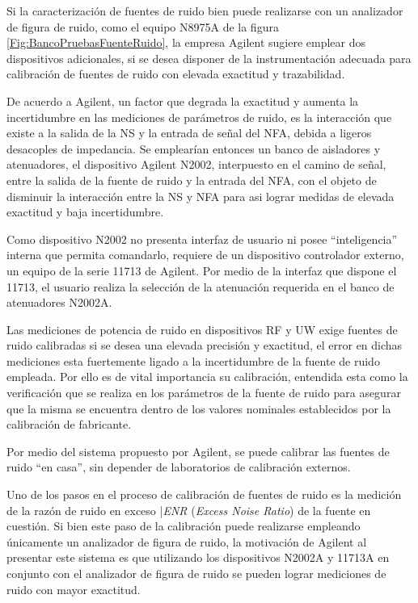 \documentclass{article}
\begin{document}
	Si la caracterización de fuentes de ruido bien puede realizarse con un analizador de figura de ruido, como el equipo N8975A de la figura \ref{Fig:BancoPruebasFuenteRuido}, la empresa Agilent sugiere emplear dos dispositivos adicionales, si se desea disponer de la instrumentación adecuada para calibración de fuentes de ruido con elevada exactitud y trazabilidad. 
	
	De acuerdo a Agilent, un factor que degrada la exactitud y aumenta la incertidumbre en las mediciones de parámetros de ruido, es la interacción que existe a la salida de la NS y la entrada de señal del NFA, debida a ligeros desacoples de impedancia. Se emplearían entonces un banco de aisladores y atenuadores, el dispositivo Agilent N2002, interpuesto en el camino de señal, entre la salida de la fuente de ruido y la entrada del NFA, con el objeto de disminuir la interacción entre la NS y NFA para asi lograr medidas de elevada exactitud y baja incertidumbre.
	
	Como dispositivo N2002 no presenta interfaz de usuario ni posee “inteligencia” interna que permita comandarlo, requiere de un dispositivo controlador externo, un equipo de la serie 11713 de Agilent. Por medio de la interfaz que dispone el 11713, el usuario realiza la selección de la atenuación requerida en el banco de atenuadores N2002A.
	
	Las mediciones de potencia de ruido en dispositivos RF y UW exige fuentes de ruido calibradas si se desea una elevada precisión y exactitud, el error en dichas mediciones esta fuertemente ligado a la incertidumbre de la fuente de ruido	empleada. Por ello es de vital importancia su calibración, entendida esta como la verificación que se realiza en los	parámetros de la fuente de ruido para asegurar que la misma se encuentra dentro de los valores nominales establecidos	por la calibración de fabricante. 
	
	Por medio del sistema propuesto por Agilent, se puede calibrar las fuentes de ruido “en casa”, sin depender de laboratorios de calibración externos.
	
	Uno de los pasos en el proceso de calibración de fuentes de ruido es la medición de la razón de ruido en exceso |\textit{ENR} (\emph{Excess Noise Ratio}) de la fuente en cuestión. Si bien este paso de la calibración puede realizarse empleando únicamente un analizador de figura de ruido, la motivación de Agilent al presentar este sistema es que utilizando los dispositivos N2002A y 11713A en conjunto con el analizador de figura de ruido se pueden lograr mediciones de ruido con mayor exactitud. 
	
\end{document}
